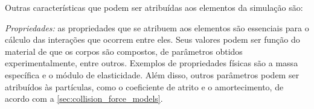 Outras características que podem ser atribuídas aos elementos da simulação são:
\begin{alineas}
\item \textit{Propriedades:} as propriedades que se atribuem aos elementos são essenciais para o cálculo das interações que ocorrem entre eles. Seus valores podem ser função do material de que os corpos são compostos, de parâmetros obtidos experimentalmente, entre outros. Exemplos de propriedades físicas são a massa específica e o módulo de elasticidade. Além disso, outros parâmetros podem ser atribuídos às partículas, como o coeficiente de atrito e o amortecimento, de acordo com a \cref{sec:collision_force_models}.



\end{alineas}
